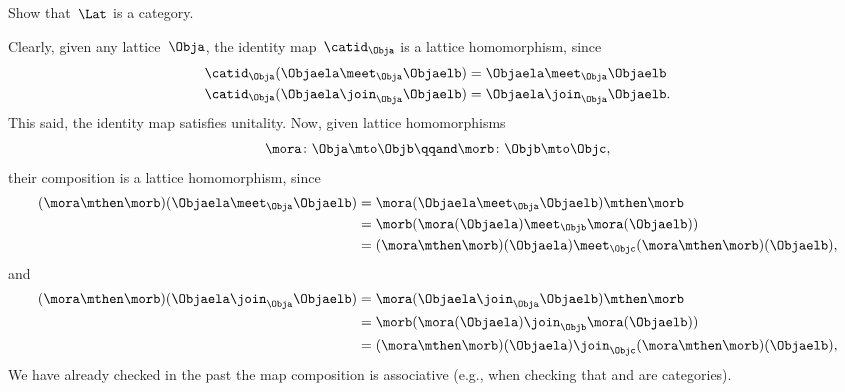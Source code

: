 \begin{exercise}
    \label{ex:lat_is_cat}
    Show that~$\Lat$ is a category.
\end{exercise}
\begin{solution}
    Clearly, given any lattice~$\Obja$, the identity map~$\catid_\Obja$ is a lattice homomorphism, since
    \begin{equation*}
        \begin{aligned}
            \catid_\Obja(\Objaela \meet_\Obja \Objaelb) & =\Objaela \meet_\Obja \Objaelb  \\
            \catid_\Obja(\Objaela \join_\Obja \Objaelb) & =\Objaela \join_\Obja \Objaelb.
        \end{aligned}
    \end{equation*}
    This said, the identity map satisfies unitality.
    Now, given lattice homomorphisms
    \begin{equation}
        \mora\colon \Obja \mto \Objb \qqand \morb\colon \Objb\mto \Objc,
    \end{equation}
    their composition is a lattice homomorphism, since
    \begin{equation*}
        \begin{aligned}
            (\mora \mthen \morb)(\Objaela \meet_\Obja \Objaelb)
             & = \mora(\Objaela \meet_\Obja \Objaelb) \mthen \morb                         \\
             & = \morb(\mora(\Objaela) \meet_\Objb \mora(\Objaelb))                        \\
             & =(\mora \mthen \morb)(\Objaela) \meet_\Objc (\mora \mthen \morb)(\Objaelb),
        \end{aligned}
    \end{equation*}
    and
    \begin{equation*}
        \begin{aligned}
            (\mora \mthen \morb)(\Objaela \join_\Obja \Objaelb)
             & = \mora(\Objaela \join_\Obja \Objaelb) \mthen \morb                         \\
             & = \morb(\mora(\Objaela) \join_\Objb \mora(\Objaelb))                        \\
             & =(\mora \mthen \morb)(\Objaela) \join_\Objc (\mora \mthen \morb)(\Objaelb),
        \end{aligned}
    \end{equation*}
    We have already checked in the past the map composition is associative (e.g., when checking that \Set and \Pos are categories).
\end{solution}

